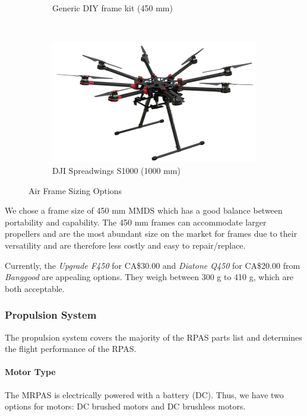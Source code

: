 \begin{figure}[H]
\begin{subfigure}[b]{0.33\textwidth}
        \caption{Generic DIY frame kit (450 mm)}
    \end{subfigure}
    ~
    \begin{subfigure}[b]{0.33\textwidth}
        \centering
        \includegraphics[width=\textwidth]{img/djis1000}
        \caption{DJI Spreadwings S1000 (1000 mm)}
    \end{subfigure}
    
    \caption{Air Frame Sizing Options }
\end{figure}

We chose a frame size of 450 mm MMDS which has a good balance between portability and capability. The 450 mm frames 
can accommodate larger propellers and are the 
most abundant size on the market for frames due to their versatility and are therefore less costly 
and easy to repair/replace.

Currently, the \textit{Upgrade F450} for CA\$30.00 and \textit{Diatone Q450} for CA\$20.00 from \textit{Banggood} are appealing options. They weigh between 300 g to 410 g, which are both acceptable.

\subsubsection{Propulsion System}

The propulsion system covers the majority of the RPAS parts list and determines the flight performance of the RPAS. 

\paragraph{Motor Type}

The MRPAS is electrically powered with a battery (DC). Thus, we have two options for motors: DC brushed 
motors and DC brushless motors.

